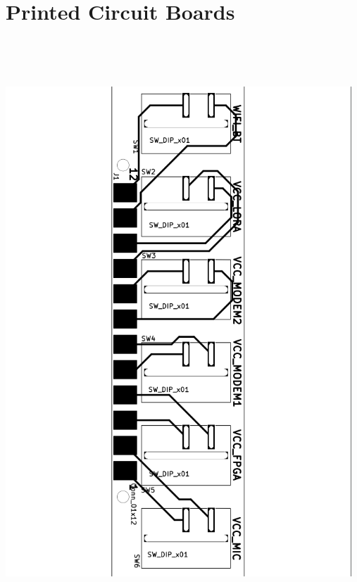 
\chapter{Printed Circuit Boards} %

\label{AppendixB} %

\clearpage

\includegraphics[width=13cm,height=22cm,keepaspectratio]{Figures/switch_board.png} \newline

